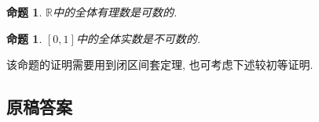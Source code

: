 \documentclass[UTF8,11pt, a4paper, oneside, fontset=none]{ctexbook}
\newtheorem{proposition}[theorem]{命题}
\begin{document}
\begin{proposition}
$\mathbb R$中的全体有理数是可数的.
\end{proposition}





\begin{proposition}
$[0, 1]$中的全体实数是不可数的.
\end{proposition}


该命题的证明需要用到闭区间套定理, 也可考虑下述较初等证明.




\clearpage

\subsection*{原稿答案}
\end{document}
